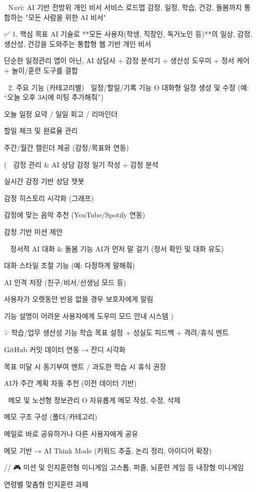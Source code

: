 🧭 Navi: AI 기반 전방위 개인 비서 서비스 로드맵
감정, 일정, 학습, 건강, 돌봄까지 통합하는 "모든 사람을 위한 AI 비서"

✅ 1. 핵심 목표
AI 기술로 **모든 사용자(학생, 직장인, 독거노인 등)**의 일상, 감정, 생산성, 건강을 도와주는 통합형 웹 기반 개인 비서

단순한 일정관리 앱이 아닌, AI 상담사 + 감정 분석기 + 생산성 도우미 + 정서 케어 + 놀이/훈련 도구를 결합

🧩 2. 주요 기능 (카테고리별)
📅 일정/할일/기록 기능 O
대화형 일정 생성 및 수정 (예: “오늘 오후 3시에 미팅 추가해줘”)

오늘 일정 요약 / 일일 회고 / 리마인더

할일 체크 및 완료율 관리

주간/월간 캘린더 제공 (감정/목표와 연동)

(
🧠 감정 관리 & AI 상담
감정 일기 작성 + 감정 분석

실시간 감정 기반 상담 챗봇

감정 히스토리 시각화 (그래프)

감정에 맞는 음악 추천 (YouTube/Spotify 연동)

감정 기반 미션 제안

🧑‍⚕️ 정서적 AI 대화 & 돌봄 기능
AI가 먼저 말 걸기 (정서 확인 및 대화 유도)

대화 스타일 조절 기능 (예: 다정하게 말해줘)

AI 인격 저장 (친구/비서/선생님 모드 등)

사용자가 오랫동안 반응 없을 경우 보호자에게 알림

기능 설명이 어려운 사용자에게 도우미 모드 안내 시스템
)

💡 학습/업무 생산성 기능
학습 목표 설정 + 성실도 피드백 + 격려/휴식 멘트

GitHub 커밋 데이터 연동 → 잔디 시각화

목표 미달 시 동기부여 멘트 / 과도한 학습 시 휴식 권장

AI가 주간 계획 자동 추천 (이전 데이터 기반)

📓 메모 및 노션형 정보관리 O
자유롭게 메모 작성, 수정, 삭제

메모 구조 구성 (폴더/카테고리)

메일로 바로 공유하거나 다른 사용자에게 공유

메모 기반 → AI Think Mode (키워드 추출, 논리 정리, 아이디어 확장)

 // 🎮 미션 및 인지훈련형 미니게임
고스톱, 퍼즐, 뇌훈련 게임 등 내장형 미니게임

연령별 맞춤형 인지훈련 과제

